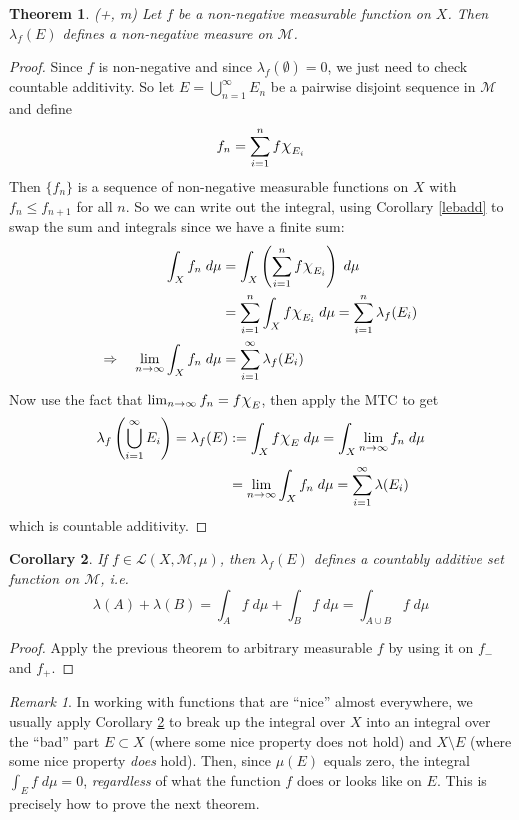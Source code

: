 \documentclass[12pt]{article}
\theoremstyle{plain}
\newtheorem{thm}{Theorem}[subsection]
\newtheorem{cor}[thm]{Corollary}
\theoremstyle{definition}
\theoremstyle{remark}
\newtheorem*{rmk}{Remark}
\newcommand*{\Chi}{\mbox{\large$\chi$}} %
\begin{document}
\begin{thm} \emph{(+, m)} 
Let $f$ be a non-negative measurable function on $X$. Then $\lambda_f(E)$ defines a non-negative measure on $\mathscr{M}$.
\end{thm}
\begin{proof}
Since $f$ is non-negative and since $\lambda_f(\emptyset)=0$, we just need to check countable additivity. So let $E=\bigcup^\infty_{n=1} E_n$ be a pairwise disjoint sequence in $\mathscr{M}$ and define
\begin{align*}
    f_n = \sum^n_{i=1} f \Chi_{E_i}
\end{align*}
Then $\{f_n\}$ is a sequence of non-negative measurable functions on $X$ with $f_n \leq f_{n+1}$ for all $n$. So we can write out the integral, using Corollary \ref{lebadd} to swap the sum and integrals since we have a finite sum:
\begin{align*}
    \int_X f_n \; d\mu &= 
    \int_X \left(\sum^n_{i=1} f\Chi_{E_i}\right)\; d\mu \\
    &= \sum^n_{i=1} \int_X f\Chi_{E_i}\; d\mu 
    = \sum^n_{i=1}\lambda_f(E_i) \\ 
    \Rightarrow \quad 
    \lim_{n\rightarrow\infty}\int_X f_n \; d\mu &= 
    \sum^\infty_{i=1}\lambda_f(E_i) 
\end{align*}
Now use the fact that $\lim_{n\rightarrow\infty}f_n = f\Chi_E$, then apply the MTC to get
\begin{align*}
    \lambda_f\left(\bigcup^\infty_{i=1} E_i\right) 
    =\lambda_f(E)
    &:= \int_X f\Chi_E \; d\mu
        = \int_X \lim_{n\rightarrow\infty}f_n \; d\mu \\
    &= \lim_{n\rightarrow\infty}\int_X f_n \; d\mu
        = \sum^\infty_{i=1} \lambda(E_i)
\end{align*}
which is countable additivity.
\end{proof}

\begin{cor} 
\label{lebsetadd}
If $f\in\mathscr{L}(X,\mathscr{M},\mu)$, then $\lambda_f(E)$ defines a countably additive set function on $\mathscr{M}$, i.e.
\[
    \lambda(A) + \lambda(B) =
    \int_A f \; d\mu + \int_B f \; d\mu 
    = \int_{A\cup B} f \; d\mu
\]
\end{cor}
\begin{proof}
Apply the previous theorem to arbitrary measurable $f$ by using it on $f_-$ and $f_+$.
\end{proof}
\begin{rmk}
In working with functions that are ``nice'' almost everywhere, we usually apply Corollary \ref{lebsetadd} to break up the integral over $X$ into an integral over the ``bad'' part $E\subset X$ (where some nice property does not hold) and $X\setminus E$ (where some nice property \emph{does} hold). Then, since $\mu(E)$ equals zero, the integral $\int_E f \; d\mu=0$, \emph{regardless} of what the function $f$ does or looks like on $E$. This is precisely how to prove the next theorem.
\end{rmk}
\end{document}
